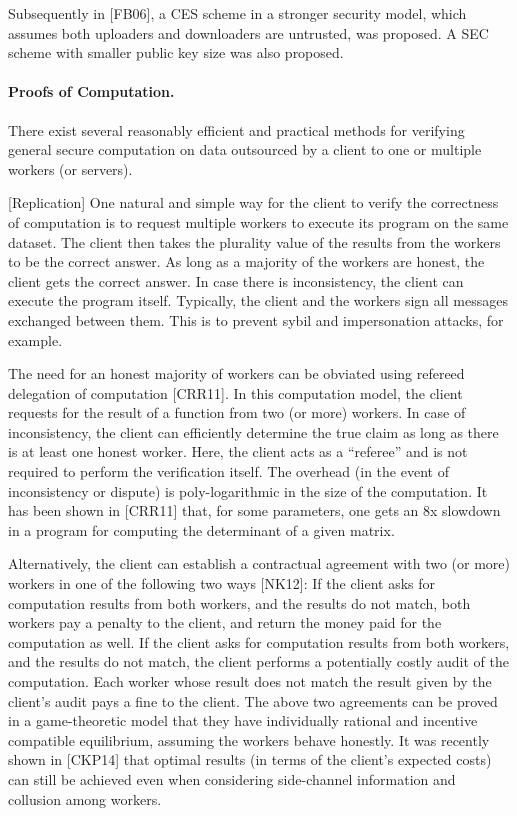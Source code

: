 Subsequently in [FB06], a CES scheme in a stronger security model, which assumes both uploaders and downloaders are untrusted, was proposed. A SEC scheme with smaller public key size was also proposed.


\paragraph{Proofs of Computation.}
There exist several reasonably efficient and practical methods for verifying general secure computation on data outsourced by a client to one or multiple workers (or servers).

[Replication]
One natural and simple way for the client to verify the correctness of computation is to request multiple workers to execute its program on the same dataset. The client then takes the plurality value of the results from the workers to be the correct answer. As long as a majority of the workers are honest, the client gets the correct answer. In case there is inconsistency, the client can execute the program itself. Typically, the client and the workers sign all messages exchanged between them. This is to prevent sybil and impersonation attacks, for example.

The need for an honest majority of workers can be obviated using refereed delegation of computation [CRR11]. In this computation model, the client requests for the result of a function from two (or more) workers. In case of inconsistency, the client can efficiently determine the true claim as long as there is at least one honest worker. Here, the client acts as a ``referee'' and is not required to perform the verification itself. The overhead (in the event of inconsistency or dispute) is poly-logarithmic in the size of the computation. It has been shown in [CRR11] that, for some parameters, one gets an 8x slowdown in a program for computing the determinant of a given matrix.

Alternatively, the client can establish a contractual agreement with two (or more) workers in one of the following two ways [NK12]:
If the client asks for computation results from both workers, and the results do not match, both workers pay a penalty to the client, and return the money paid for the computation as well.
If the client asks for computation results from both workers, and the results do not match, the client performs a potentially costly audit of the computation. Each worker whose result does not match the result given by the client's audit pays a fine to the client.
The above two agreements can be proved in a game-theoretic model that they have individually rational and incentive compatible equilibrium, assuming the workers behave honestly. It was recently shown in [CKP14] that optimal results (in terms of the client's expected costs) can still be achieved even when considering side-channel information and collusion among workers.

